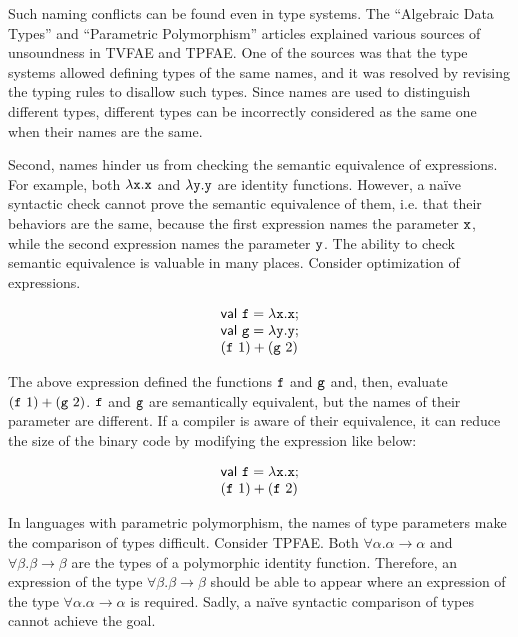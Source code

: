 Such naming conflicts can be found even in type systems. The “Algebraic Data
Types” and “Parametric Polymorphism” articles explained various sources of
unsoundness in TVFAE and TPFAE. One of the sources was that the type systems
allowed defining types of the same names, and it was resolved by revising the
typing rules to disallow such types. Since names are used to distinguish
different types, different types can be incorrectly considered as the same one
when their names are the same.

Second, names hinder us from checking the semantic equivalence of expressions.
For example, both $\lambda \texttt{x}.\texttt{x}$ and $\lambda \texttt{y}.\texttt{y}$ are
identity functions. However, a naïve syntactic check cannot prove the semantic
equivalence of them, i.e. that their behaviors are the same, because the first
expression names the parameter $\texttt{x}$, while the second expression names the
parameter $\texttt{y}$. The ability to check semantic equivalence is valuable in many
places. Consider optimization of expressions.

\[
\begin{array}{l}
\textsf{val}\ \texttt{f}=\lambda \texttt{x}.\texttt{x}; \\
\textsf{val}\ \texttt{g}=\lambda \texttt{y}.\texttt{y}; \\
(\texttt{f}\ 1)+(\texttt{g}\ 2) \\
\end{array}
\]

The above expression defined the functions $\texttt{f}$ and $\texttt{g}$ and, then,
evaluate $(\texttt{f}\ 1)+(\texttt{g}\ 2)$. $\texttt{f}$ and $\texttt{g}$ are semantically
equivalent, but the names of their parameter are different. If a compiler is
aware of their equivalence, it can reduce the size of the binary code by
modifying the expression like below:

\[
\begin{array}{l}
\textsf{val}\ \texttt{f}=\lambda \texttt{x}.\texttt{x}; \\
(\texttt{f}\ 1)+(\texttt{f}\ 2) \\
\end{array}
\]

In languages with parametric polymorphism, the names of type parameters make the
comparison of types difficult. Consider TPFAE. Both
$\forall\alpha.\alpha\rightarrow\alpha$ and $\forall\beta.\beta\rightarrow\beta$
are the types of a polymorphic identity function. Therefore, an expression of the
type $\forall\beta.\beta\rightarrow\beta$ should be able to appear where an
expression of the type $\forall\alpha.\alpha\rightarrow\alpha$ is required.
Sadly, a naïve syntactic comparison of types cannot achieve the goal.

